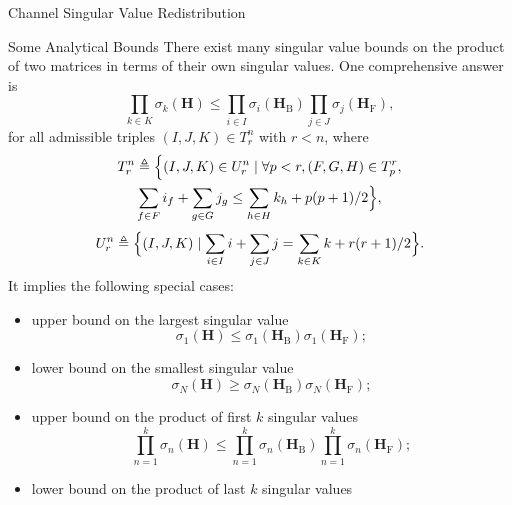 \documentclass[journal]{IEEEtran}
\begin{document}
\begin{section}{Channel Singular Value Redistribution}
\begin{subsection}{Some Analytical Bounds}
		There exist many singular value bounds on the product of two matrices in terms of their own singular values.
		One comprehensive answer is \cite{Fulton2000}
		\begin{equation}
			\prod_{k \in {K}} \sigma_k(\mathbf{H}) \le \prod_{i \in {I}} \sigma_i(\mathbf{H}_\mathrm{B}) \prod_{j \in {J}} \sigma_j(\mathbf{H}_\mathrm{F}),
			\label{iq:sv_bound_fc}
		\end{equation}
		for all admissible triples $(I, J, K) \in T_r^n$ with $r < n$, where
		\begin{equation}
			\begin{gathered}
				T_r^n \triangleq \Bigl\{(I, J, K) \in U_r^n \mid \forall p < r, (F, G, H) \in T_p^r,\\
				\sum_{f \in F} i_f + \sum_{g \in G} j_g \le \sum_{h \in H} k_h + p(p+1)/2 \Bigr\},
			\end{gathered}
		\end{equation}
		\begin{equation}
			U_r^n \triangleq \Bigl\{(I, J, K) \mid \sum_{i \in I} i + \sum_{j \in J} j = \sum_{k \in K} k + r(r+1)/2\Bigr\}.
		\end{equation}
		It implies the following special cases:
		\begin{itemize}
			\item upper bound on the largest singular value
			\begin{equation}
				\sigma_1(\mathbf{H}) \le \sigma_1(\mathbf{H}_\mathrm{B}) \sigma_1(\mathbf{H}_\mathrm{F});
			\end{equation}
			\item lower bound on the smallest singular value
			\begin{equation}
				\sigma_N(\mathbf{H}) \ge \sigma_N(\mathbf{H}_\mathrm{B}) \sigma_N(\mathbf{H}_\mathrm{F});
			\end{equation}
			\item upper bound on the product of first $k$ singular values
			\begin{equation}
				\prod_{n=1}^k \sigma_n(\mathbf{H}) \le \prod_{n=1}^k \sigma_n(\mathbf{H}_\mathrm{B}) \prod_{n=1}^k \sigma_n(\mathbf{H}_\mathrm{F});
			\end{equation}
			\item lower bound on the product of last $k$ singular values

\end{itemize}
\end{subsection}
\end{section}
\end{document}
